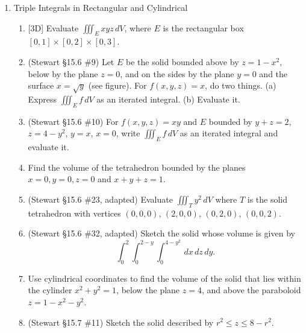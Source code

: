 \documentclass[12pt]{article}
\newcommand{\dimtag}[1]{{\footnotesize\textsc{[#1]}}\;}
\begin{document}
\begin{enumerate}
\item Triple Integrals in Rectangular and Cylindrical
    \begin{enumerate}
        \item \dimtag{3D} Evaluate $\iiint_{E} xyz \, dV$, where $E$ is the rectangular box $[0, 1] \times [0, 2] \times [0, 3]$.
        \item (Stewart \S15.6 \#9) Let $E$ be the solid bounded above by $z = 1 - x^2$, below by the plane $z = 0$, and on the sides by the plane $y = 0$ and the surface $x = \sqrt{y}$ (see figure). For $f(x,y,z) = x$, do two things. (a) Express $\iiint_E f\,dV$ as an iterated integral. (b) Evaluate it.
        \begin{center}
        \end{center}
        \item (Stewart \S15.6 \#10) For $f(x,y,z) = xy$ and $E$ bounded by $y + z = 2$, $z = 4 - y^2$, $y = x$, $x = 0$, write $\iiint_E f\,dV$ as an iterated integral and evaluate it.
        \item Find the volume of the tetrahedron bounded by the planes $x=0, y=0, z=0$ and $x + y + z = 1$.
        \item (Stewart \S15.6 \#23, adapted) Evaluate $\iiint_T y^2\,dV$ where $T$ is the solid tetrahedron with vertices $(0,0,0)$, $(2,0,0)$, $(0,2,0)$, $(0,0,2)$.
        \item (Stewart \S15.6 \#32, adapted) Sketch the solid whose volume is given by
        \[ \int_0^2 \int_0^{2-y}\int_0^{4 - y^2}\, dx\, dz\, dy. \]
        \item Use cylindrical coordinates to find the volume of the solid that lies within the cylinder $x^2 + y^2 = 1$, below the plane $z = 4$, and above the paraboloid $z = 1 - x^2 - y^2$.
        \item (Stewart \S15.7 \#11) Sketch the solid described by $r^2 \leq z \leq 8 - r^2$.

\end{enumerate}
\end{enumerate}
\end{document}
